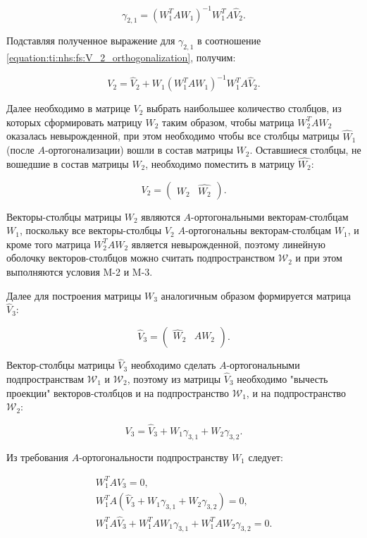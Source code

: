 $$
	\gamma_{2,1} = \left ( W_1^T A W_1 \right ) ^ {-1} W_1^T A \widehat{V}_2.
$$

Подставляя полученное выражение для $\gamma_{2,1}$ в соотношение \ref{equation:ti:nhs:fs:V_2_orthogonalization}, получим:

$$
	V_2 = \widehat{V}_2 + W_1 \left ( W_1^T A W_1 \right ) ^ {-1} W_1^T A \widehat{V}_2.
$$

Далее необходимо в матрице $V_2$ выбрать наибольшее количество столбцов, из которых сформировать матрицу $W_2$ таким образом, чтобы
матрица $W_2^T A W_2$ оказалась невырожденной, при этом необходимо чтобы все столбцы матрицы $\widehat{W}_1$ (после $A$-ортогонализации)
вошли в состав матрицы $W_2$. Оставшиеся столбцы, не вошедшие в состав матрицы $W_2$, необходимо поместить в матрицу $\widehat{W_2}$:

$$
	V_2 =
		\begin{pmatrix}
			W_2 & \widehat{W_2}
		\end{pmatrix}
	.
$$

Векторы-столбцы матрицы $W_2$ являются $A$-ортогональными векторам-столбцам $W_1$, поскольку все векторы-столбцы $V_2$
$A$-ортогональны векторам-столбцам $W_1$, и кроме того матрица $ W_2^T A W_2 $ является невырожденной, поэтому линейную оболочку
векторов-столбцов можно считать подпространством $\mathcal W_2$ и при этом выполняются условия M-2 и M-3.

Далее для построения матрицы $W_3$ аналогичным образом формируется матрица $\widehat{V}_3$:

$$
	\widehat{V}_3 =
		\begin{pmatrix}
		\widehat{W}_2 & A W_2 \\
		\end{pmatrix}
	.
$$

Вектор-столбцы матрицы $\widehat{V}_3$ необходимо сделать $A$-ортогональными подпространствам $\mathcal W_1$ и $\mathcal W_2$,
поэтому из матрицы $\widehat{V}_3$ необходимо "вычесть проекции"{} векторов-столбцов и на подпространство $\mathcal W_1$, и на
подпространство $\mathcal W_2$:

\begin{equation} \label{equation:ti:nhs:fs:V_3_orthogonalization}
	V_3 = \widehat{V}_3 + W_1 \gamma_{3,1} + W_2 \gamma_{3,2}.
\end{equation}

Из требования $A$-ортогональности подпространству $W_1$ следует:

$$
	\begin{array}{c}
		W_1^T A V_3 = 0, \\
 		W_1^T A ( \widehat{V}_3 + W_1 \gamma_{3,1} + W_2 \gamma_{3,2} ) = 0, \\
 		W_1^T A \widehat{V}_3 + W_1^T A W_1 \gamma_{3,1} + W_1^T A W_2 \gamma_{3,2} = 0.
	\end{array}
$$

